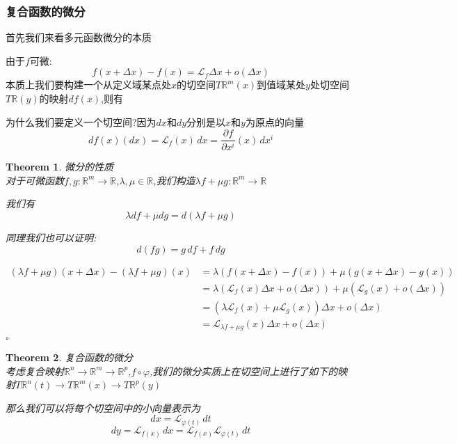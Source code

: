 \documentclass[11pt,hyperref,a4paper,UTF8]{ctexart}
\newtheorem{theorem}{Theorem}[subsection]
\newenvironment{cproof}{%
\heiti{证明}\kaishu
}{%
  \hfill $\square$
  \par\bigskip
}
\newcommand{\RR}{\mathbb{R}}
\begin{document}
\begin{CJK}{UTF8}{gkai}
\subsubsection{复合函数的微分}
首先我们来看多元函数微分的本质

由于$f$可微:
\[f(x + \Delta x) - f(x) = \mathcal{L}_f \Delta x+ o(\Delta x)\]
本质上我们要构建一个从定义域某点处$x$的切空间$T\RR^m(x)$到值域某处$y$处切空间$T\RR(y)$的映射$df(x)$,则有

为什么我们要定义一个切空间?因为$dx$和$dy$分别是以$x$和$y$为原点的向量
\[df(x)(dx) = \mathcal{L}_f(x)\, dx = \frac{\partial f}{\partial x^i}(x) \, dx^i\]

\begin{theorem}
  微分的性质\\

  对于可微函数$f,g : \RR^m \to \RR$,$\lambda,\mu \in \RR$,我们构造$\lambda f + \mu g: \RR^m \to \RR$

  我们有
  \[\lambda df + \mu dg = d(\lambda f + \mu g)\]

  同理我们也可以证明: 
  \[d(fg) = g \, df + f \, dg\]
\end{theorem}

\begin{cproof}
  \[
    \begin{aligned}
      (\lambda f + \mu g)(x + \Delta x) - (\lambda f + \mu g)(x)&= \lambda(f(x+\Delta x) - f(x)) + \mu (g(x + \Delta x) - g(x))\\
      &= \lambda(\mathcal{L}_f(x) \Delta x + o(\Delta x)) + \mu (\mathcal{L}_g(x) + o(\Delta x))\\
      &= (\lambda\mathcal{L}_f(x) + \mu \mathcal{L}_g(x))\Delta x + o(\Delta x)\\
      &= \mathcal{L}_{\lambda f + \mu g}(x) \Delta x + o(\Delta x)\\
    \end{aligned} \]
\end{cproof}

\begin{theorem}
  复合函数的微分\\

考虑复合映射$\RR^n \to \RR^m \to \RR^p$,$f\circ \varphi$,我们的微分实质上在切空间上进行了如下的映射$T\RR^n(t) \to T\RR^m(x) \to T\RR^p(y)$

那么我们可以将每个切空间中的小向量表示为
\[dx = \mathcal{L}_{\varphi(t)} \, dt\]
\[dy = \mathcal{L}_{f(x)} \, dx = \mathcal{L}_{f(x)} \mathcal{L}_{\varphi(t)} \, dt \]


\end{theorem}
\end{CJK}
\end{document}
